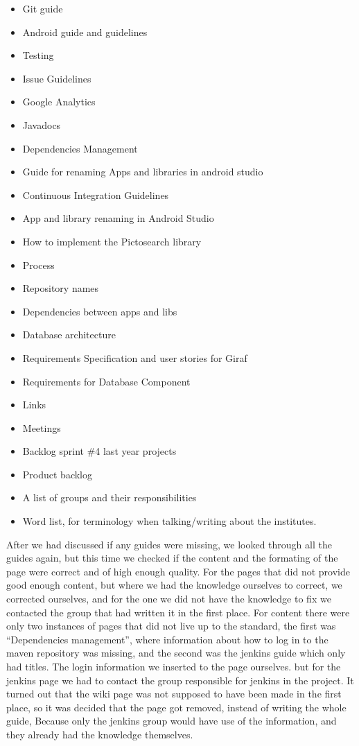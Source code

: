 \begin{itemize}
	\item Git guide
	\item Android guide and guidelines
	\item Testing
	\item Issue Guidelines
	\item Google Analytics
	\item Javadocs 
	\item Dependencies Management
	\item Guide for renaming Apps and libraries in android studio
	\item Continuous Integration Guidelines
	\item App and library renaming in Android Studio
	\item How to implement the Pictosearch library
	\item Process
	\item Repository names
	\item Dependencies between apps and libs
	\item Database architecture
	\item Requirements Specification and user stories for Giraf
	\item Requirements for Database Component
	\item Links
	\item Meetings
	\item Backlog sprint \#4 last year projects
	\item Product backlog
	\item A list of groups and their responsibilities
	\item Word list, for terminology when talking/writing about the institutes.
	
\end{itemize}

After we had discussed if any guides were missing, we looked through all the guides again, but this time we checked if the content and the formating of the page were correct and of high enough quality. For the pages that did not provide good enough content, but where we had the knowledge ourselves to correct, we corrected ourselves, and for the one we did not have the knowledge to fix we contacted the group that had written it in the first place. For content there were only two instances of pages that did not live up to the standard, the first was “Dependencies management”, where information about how to log in to the maven repository was missing, and the second was the jenkins guide which only had titles. The login information we inserted to the page ourselves. but for the jenkins page we had to contact the group responsible for jenkins in the project. It turned out that the wiki page was not supposed to have been made in the first place, so it was decided that the page got removed, instead of writing the whole guide, Because only the jenkins group would have use of the information, and they already had the knowledge themselves.

